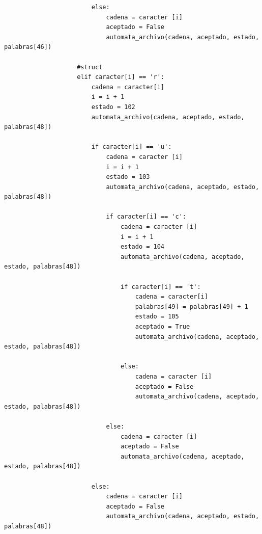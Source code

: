 \documentclass{article}
\begin{document}
\begin{flushleft}
\begin{lstlisting}
                        else:
                            cadena = caracter [i]
                            aceptado = False
                            automata_archivo(cadena, aceptado, estado, palabras[46])
                            
                    #struct
                    elif caracter[i] == 'r':
                        cadena = caracter[i]
                        i = i + 1
                        estado = 102
                        automata_archivo(cadena, aceptado, estado, palabras[48])
                        
                        if caracter[i] == 'u':
                            cadena = caracter [i]
                            i = i + 1
                            estado = 103
                            automata_archivo(cadena, aceptado, estado, palabras[48])   
                            
                            if caracter[i] == 'c':
                                cadena = caracter [i]
                                i = i + 1
                                estado = 104
                                automata_archivo(cadena, aceptado, estado, palabras[48])
                                
                                if caracter[i] == 't':
                                    cadena = caracter[i]
                                    palabras[49] = palabras[49] + 1
                                    estado = 105
                                    aceptado = True
                                    automata_archivo(cadena, aceptado, estado, palabras[48])
                                    
                                else:
                                    cadena = caracter [i]
                                    aceptado = False
                                    automata_archivo(cadena, aceptado, estado, palabras[48])
                                    
                            else:
                                cadena = caracter [i]
                                aceptado = False
                                automata_archivo(cadena, aceptado, estado, palabras[48])
                        
                        else:
                            cadena = caracter [i]
                            aceptado = False
                            automata_archivo(cadena, aceptado, estado, palabras[48])
                            

\end{lstlisting}
\end{flushleft}
\end{document}
